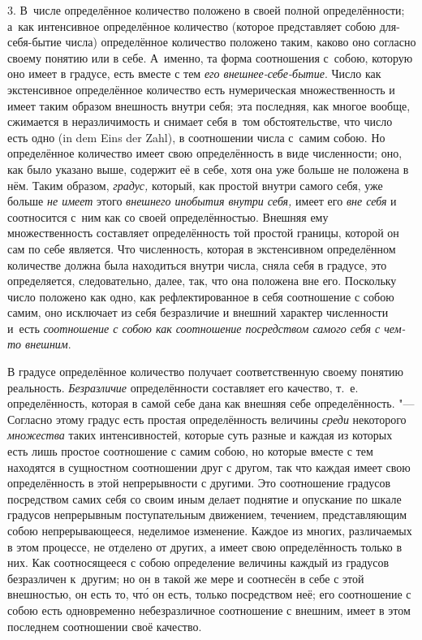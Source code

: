3. В~числе определённое количество положено в своей полной определённости;
а~как интенсивное определённое количество (которое представляет собою
для-себя-бытие числа) определённое количество положено таким, каково оно
согласно своему понятию или в себе. А~именно, та форма соотношения с~собою,
которую оно имеет в градусе, есть вместе с тем
{\em его внешнее-себе-бытие}. Число как экстенсивное определённое количество есть нумерическая
множественность и имеет таким образом внешность внутри себя; эта последняя, как
многое вообще, сжимается в неразличимость и снимает себя в~том обстоятельстве,
что число есть одно (in dem Eins der Zahl), в соотношении числа с~самим собою.
Но определённое количество имеет свою определённость в виде численности; оно,
как было указано выше, содержит её в себе, хотя она уже больше не положена в
нём. Таким образом, {\em градус,} который, как простой внутри самого себя, уже
больше {\em не имеет} этого {\em внешнего инобытия внутри себя,} имеет его
{\em вне себя} и соотносится с~ним как со своей определённостью. Внешняя ему
множественность составляет определённость той простой границы, которой он сам
по себе является. Что численность, которая в экстенсивном определённом
количестве должна была находиться внутри числа, сняла себя в градусе, это
определяется, следовательно, далее, так, что она положена вне его. Поскольку
число положено как одно, как рефлектированное в себя соотношение с собою самим,
оно исключает из себя безразличие и внешний характер численности и~есть
{\em соотношение с собою как соотношение посредством
самого себя с чем-то внешним}.

В градусе определённое количество получает соответственную своему понятию
реальность. {\em Безразличие} определённости составляет его качество, т.~е.
определённость, которая в самой себе дана как внешняя себе определённость. "---
Согласно этому градус есть простая определённость величины {\em среди}
некоторого {\em множества} таких интенсивностей, которые суть разные и каждая
из которых есть лишь простое соотношение с самим собою, но которые вместе с тем
находятся в сущностном соотношении друг с другом, так что каждая имеет свою
определённость в этой непрерывности с другими. Это соотношение градусов
посредством самих себя со своим иным делает поднятие и опускание по шкале
градусов непрерывным поступательным движением, течением, представляющим собою
непрерывающееся, неделимое изменение. Каждое из многих, различаемых в этом
процессе, не отделено от других, а имеет свою определённость только в них. Как
соотносящееся с собою определение величины каждый из градусов безразличен
к~другим; но он в такой же мере и соотнесён в себе с этой внешностью, он есть
то, чт\'{о} он есть, только посредством неё; его соотношение с собою есть
одновременно небезразличное соотношение с внешним, имеет в этом последнем
соотношении своё качество.

